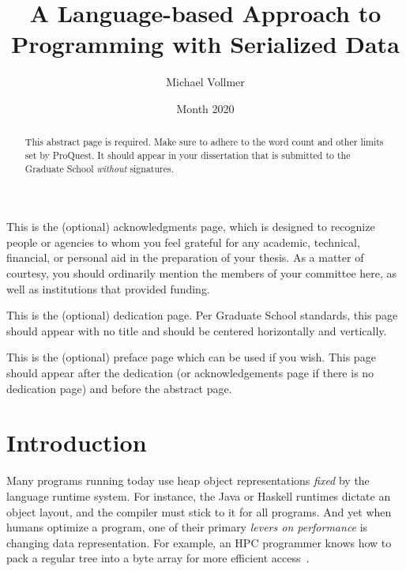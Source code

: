\documentclass[showabstract,showacknowledgments,showpreface,showdedication]{iuphd}
\title{A Language-based Approach to Programming with Serialized Data}
\author{Michael Vollmer}
\date{Month 2020} %
\theoremstyle{nonumberplain}
\begin{document}
\maketitle
\acceptancepage




\begin{acknowledgments}
This is the (optional) acknowledgments page, which is designed to recognize people or agencies to whom you feel grateful for any academic, technical, financial, or personal aid in the preparation of your thesis. As a matter of courtesy, you should ordinarily mention the members of your committee here, as well as institutions that provided funding.
\end{acknowledgments}


\begin{dedication}
This is the (optional) dedication page. Per Graduate School standards, this page should appear with no title and should be centered horizontally and vertically.
\end{dedication}


\begin{preface}
This is the (optional) preface page which can be used if you wish. This page should appear after the dedication (or acknowledgements page if there is no dedication page) and before the abstract page.
\end{preface}


\begin{abstract}
This abstract page is required. Make sure to adhere to the word count and other limits set by ProQuest. It should appear in your dissertation that is submitted to the Graduate School \emph{without} signatures.
\end{abstract}

\newpage


\tableofcontents

\chapter{Introduction}\label{chapter:intro}

Many programs running today use heap object representations {\em fixed}
by the language runtime system.
For instance, the Java or Haskell runtimes dictate an object layout, and the
compiler must stick to it for all programs.
%
And yet when humans optimize a program, one of their primary {\em levers on
performance} is changing data representation.  For example, an HPC programmer
knows how to pack a regular tree into a byte array for more efficient
access~\cite{makino90,goldfarb13sc,Meyerovich2011}.
\end{document}
